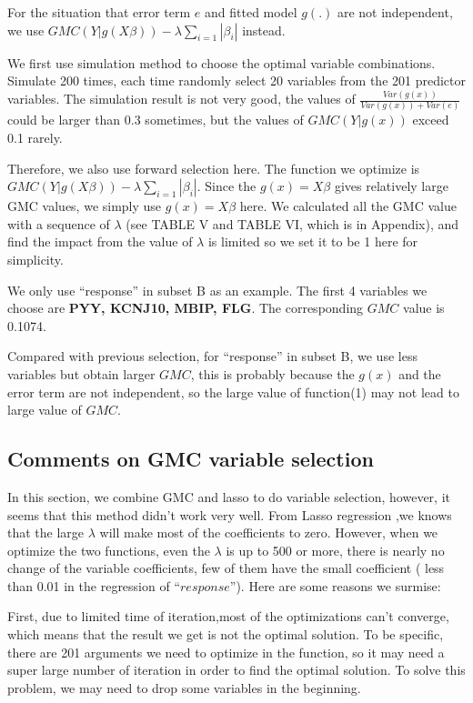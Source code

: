 \documentclass[conference,letterpaper]{IEEEtran}
\begin{document}
{For the situation that error term $e$ and fitted model $g(.)$ are not independent, we use  $GMC(Y|g(X\beta))-\lambda\sum_{i=1}{|\beta_i|}$ instead.

We first use simulation method to choose the optimal variable combinations. Simulate 200 times, each time randomly select 20 variables from the 201 predictor variables. The simulation result is not very good, the values of $\frac{Var(g(x))}{Var(g(x))+Var(e)}$ could be larger than 0.3 sometimes, but the values of $GMC(Y|g(x))$ exceed 0.1 rarely. 

Therefore, we also use forward selection here. The function we optimize is $GMC(Y|g(X\beta))-\lambda\sum_{i=1}{|\beta_i|}$. Since the $g(x)=X\beta$ gives relatively large GMC values, we simply use $g(x)=X\beta$  here. We calculated all the GMC value with a sequence of $\lambda$ (see TABLE V and TABLE VI, which is in Appendix), and find the impact from the value of $\lambda$ is limited so we set it to be 1 here for simplicity. 

We only use ``response'' in subset B as an example. The first 4 variables we choose are \textbf{PYY, KCNJ10, MBIP, FLG}. The corresponding $GMC$ value is 0.1074.

Compared with previous selection, for ``response'' in subset B,  we use less  variables but obtain larger $GMC$, this is probably because the $g(x)$ and the error term are not independent, so the large value of function(1) may not lead to large value of $GMC$. 

\subsection{{\fontsize{11}{13}\selectfont Comments on GMC variable selection}}
 

In this section, we combine GMC and lasso to do variable selection, however, it seems that this method didn't work very well. From Lasso regression ,we knows that the large $\lambda$ will make most of the coefficients to zero. However, when we optimize the two functions, even the $\lambda$ is up to 500 or more, there is nearly no change of the variable coefficients, few of them have the small coefficient ( less than 0.01 in the regression of ``$response$''). Here are some reasons we surmise: 

First, due to limited time of iteration,most of the optimizations can't converge, which means that the result we get is not the optimal solution. To be specific, there are 201 arguments we need to optimize in the function, so it may need a super large number of iteration in order to find the optimal solution. To solve this problem, we may need to drop some variables in the beginning.
  
}
\end{document}
